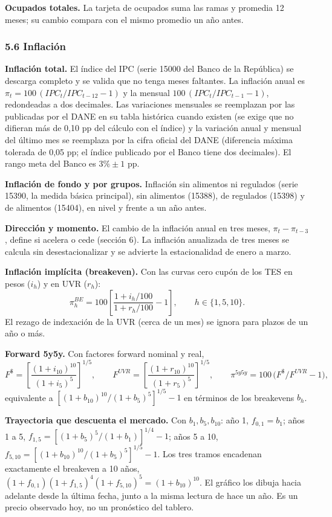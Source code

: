 \textbf{Ocupados totales.} La tarjeta de ocupados suma las ramas y
promedia 12 meses; su cambio compara con el mismo promedio un año antes.

\hypertarget{inflaciuxf3n}{%
\subsubsection{5.6 Inflación}\label{inflaciuxf3n}}

\textbf{Inflación total.} El índice del IPC (serie 15000 del Banco de la
República) se descarga completo y se valida que no tenga meses
faltantes. La inflación anual es \(\pi_t=100\,(IPC_t/IPC_{t-12}-1)\) y
la mensual \(100\,(IPC_t/IPC_{t-1}-1)\), redondeadas a dos decimales.
Las variaciones mensuales se reemplazan por las publicadas por el DANE
en su tabla histórica cuando existen (se exige que no difieran más de
0,10 pp del cálculo con el índice) y la variación anual y mensual del
último mes se reemplaza por la cifra oficial del DANE (diferencia máxima
tolerada de 0,05 pp; el índice publicado por el Banco tiene dos
decimales). El rango meta del Banco es \(3\% \pm 1\) pp.

\textbf{Inflación de fondo y por grupos.} Inflación sin alimentos ni
regulados (serie 15390, la medida básica principal), sin alimentos
(15388), de regulados (15398) y de alimentos (15404), en nivel y frente
a un año antes.

\textbf{Dirección y momento.} El cambio de la inflación anual en tres
meses, \(\pi_t-\pi_{t-3}\), define si acelera o cede (sección 6). La
inflación anualizada de tres meses se calcula sin desestacionalizar y se
advierte la estacionalidad de enero a marzo.

\textbf{Inflación implícita (breakeven).} Con las curvas cero cupón de
los TES en pesos (\(i_h\)) y en UVR (\(r_h\)):
\[\pi^{BE}_h = 100\left[\frac{1+i_h/100}{1+r_h/100}-1\right],\qquad h\in\{1,5,10\}.\]
El rezago de indexación de la UVR (cerca de un mes) se ignora para
plazos de un año o más.

\textbf{Forward 5y5y.} Con factores forward nominal y real,
\[F^{\$}=\left[\frac{(1+i_{10})^{10}}{(1+i_5)^{5}}\right]^{1/5},\qquad
F^{UVR}=\left[\frac{(1+r_{10})^{10}}{(1+r_5)^{5}}\right]^{1/5},\qquad
\pi^{5y5y}=100\,\big(F^{\$}/F^{UVR}-1\big),\] equivalente a
\([(1+b_{10})^{10}/(1+b_5)^5]^{1/5}-1\) en términos de los breakevens
\(b_h\).

\textbf{Trayectoria que descuenta el mercado.} Con \(b_1,b_5,b_{10}\):
año 1, \(f_{0,1}=b_1\); años 1 a 5,
\(f_{1,5}=[(1+b_5)^5/(1+b_1)]^{1/4}-1\); años 5 a 10,
\(f_{5,10}=[(1+b_{10})^{10}/(1+b_5)^5]^{1/5}-1\). Los tres tramos
encadenan exactamente el breakeven a 10 años,
\((1+f_{0,1})(1+f_{1,5})^4(1+f_{5,10})^5=(1+b_{10})^{10}\). El gráfico
los dibuja hacia adelante desde la última fecha, junto a la misma
lectura de hace un año. Es un precio observado hoy, no un pronóstico del
tablero.

